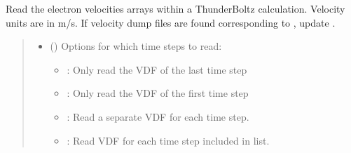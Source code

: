 \documentclass[letterpaper,10pt,english,openany,oneside]{sphinxmanual}
\begin{document}
\begin{fulllineitems}
\begin{fulllineitems}
\label{\detokenize{api/pytb.ThunderBoltz.get_vdfs:pytb.ThunderBoltz.get_vdfs}}
\pysigstartsignatures
{}
\pysigstopsignatures
\sphinxAtStartPar
Read the electron velocities arrays within a ThunderBoltz calculation.
Velocity units are in m/s. If velocity dump files are found
corresponding to , update .
\begin{quote}\begin{description}
\begin{itemize}
\item {} 
\sphinxAtStartPar
{} (\sphinxstyleliteralemphasis{\sphinxupquote{, }}\sphinxstyleliteralemphasis{\sphinxupquote{{[}}}\sphinxstyleliteralemphasis{\sphinxupquote{{]}}}) \textendash{} 
\sphinxAtStartPar
Options for which time steps to
read:
\begin{itemize}
\item {} 
\sphinxAtStartPar
{}: Only read the VDF of the last time step

\item {} 
\sphinxAtStartPar
{}: Only read the VDF of the first time step

\item {} 
\sphinxAtStartPar
{}: Read a separate VDF for each time step.

\item {} 
\sphinxAtStartPar
{}: Read VDF for each time step included in list.


\end{itemize}
\end{itemize}
\end{description}
\end{quote}
\end{fulllineitems}
\end{fulllineitems}
\end{document}
